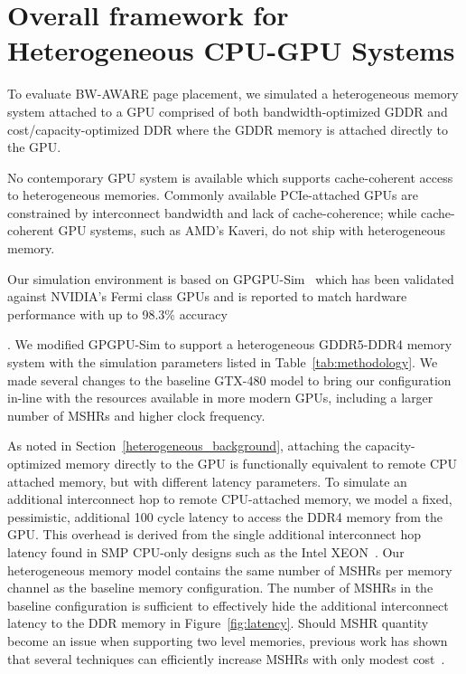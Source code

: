 \section{Overall framework for Heterogeneous CPU-GPU Systems}
To evaluate BW-AWARE page placement, we simulated a heterogeneous memory system
attached to a GPU comprised of both bandwidth-optimized GDDR and
cost/capacity-optimized DDR where the GDDR memory is attached directly to the
GPU\@.  {\color{black} No contemporary GPU system is available which supports
cache-coherent access to heterogeneous memories.  Commonly available
PCIe-attached GPUs are constrained by interconnect bandwidth and lack of
cache-coherence; while cache-coherent GPU systems, such as AMD's Kaveri, do not
ship with heterogeneous memory. 

Our simulation environment is based on GPGPU-Sim~\cite{gpgpusimIspass09} which
has been validated against NVIDIA's Fermi class GPUs and is reported to match
hardware performance with up to 98.3\% accuracy~\cite{gpgpusimManual}}.  We
modified GPGPU-Sim to support a heterogeneous GDDR5-DDR4 memory system with the
simulation parameters listed in Table~\ref{tab:methodology}.  We made several
changes to the baseline GTX-480 model to bring our configuration in-line with
the resources available in more modern GPUs, including a larger number of MSHRs
and higher clock frequency.

As noted in Section~\ref{heterogeneous_background}, attaching the
capacity-optimized memory directly to the GPU is functionally equivalent to
remote CPU attached memory, but with different latency parameters.  To simulate
an additional interconnect hop to remote CPU-attached memory, we model a fixed,
pessimistic, additional 100 cycle latency to access the DDR4 memory from the
GPU\@. This overhead is derived from the single additional interconnect hop
latency found in SMP CPU-only designs such as the Intel XEON~\cite{INTELXEON}\@.
Our heterogeneous memory model contains the same number of MSHRs per memory
channel as the baseline memory configuration.  The number of MSHRs in the
baseline configuration is sufficient to effectively hide the additional
interconnect latency to the DDR memory in Figure~\ref{fig:latency}. Should MSHR
quantity become an issue when supporting two level memories, previous work has
shown that several techniques can efficiently increase MSHRs with only modest
cost~\cite{ref:tuck:scalablemisshandling, ref:minikin:prefetch}.

